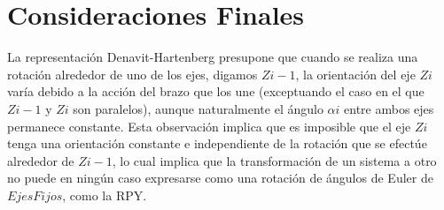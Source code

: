 \documentclass[11pt,a4paper,oldfontcommands,oneside]{memoir}
\begin{document}
\chapter{Consideraciones Finales}
La representación Denavit-Hartenberg presupone que cuando se realiza una rotación alrededor de uno de los ejes, digamos $Zi-1$, la orientación del eje $Zi$ varía debido a la acción del brazo que los une (exceptuando el caso en el que $Zi-1$ y $Zi$ son paralelos), aunque naturalmente el ángulo $\alpha i$ entre ambos ejes permanece constante.
Esta observación implica que es imposible que el eje $Zi$ tenga una orientación constante e independiente de la rotación que se efectúe alrededor de $Zi-1$, lo cual implica que la transformación de un sistema a otro no puede en ningún caso expresarse como una rotación de ángulos de Euler de $Ejes Fijos$, como la RPY.

\vspace{2cm}
\hfill


\end{document}
